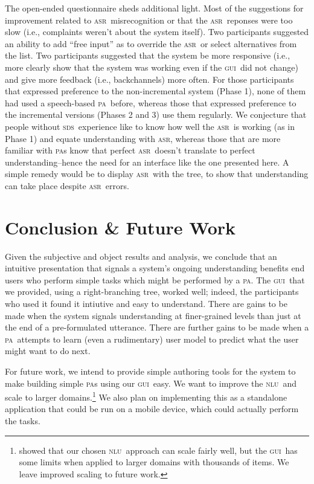 \documentclass[11pt]{article}
\newcommand{\sds}[0]{\textsc{sds}}
\newcommand{\nlu}[0]{\textsc{nlu}}
\newcommand{\asr}[0]{\textsc{asr}}
\newcommand{\ui}[0]{\textsc{gui}}
\newcommand{\pa}[0]{\textsc{pa}}
\begin{document}
The open-ended questionnaire sheds additional light. Most of the suggestions for improvement related to \asr\ misrecognition or that the \asr\ reponses were too slow (i.e., complaints weren't about the system itself). Two participants suggested an ability to add ``free input'' as to override the \asr\ or select alternatives from the list. Two participants suggested that the system be more responsive (i.e., more clearly show that the system was working even if the \ui\ did not change) and give more feedback (i.e., backchannels) more often. For those participants that expressed preference to the non-incremental system (Phase 1), none of them had used a speech-based \pa\ before, whereas those that expressed preference to the incremental versions (Phases 2 and 3) use them regularly. We conjecture that people without \sds\ experience like to know how well the \asr\ is working (as in Phase 1) and equate understanding with \asr, whereas those that are more familiar with \pa s know that perfect \asr\ doesn't translate to perfect understanding--hence the need for an interface like the one presented here. A simple remedy would be to display \asr\ with the tree, to show that understanding can take place despite \asr\ errors.

\section{Conclusion \& Future Work}

Given the subjective and object results and analysis, we conclude that an intuitive presentation that signals a system's ongoing understanding benefits end users who perform simple tasks which might be performed by a \pa. The \ui\ that we provided, using a right-branching tree, worked well; indeed, the participants who used it found it intiutive and easy to understand. There are gains to be made when the system signals understanding at finer-grained levels than just at the end of a pre-formulated utterance. There are further gains to be made when a \pa\ attempts to learn (even a rudimentary) user model to predict what the user might want to do next. 

For future work, we intend to provide simple authoring tools for the system to make building simple \pa s using our \ui\ easy. We want to improve the \nlu\ and scale to larger domains.\footnote{ showed that our chosen \nlu\ approach can scale fairly well, but the \ui\ has some limits when applied to larger domains with thousands of items. We leave improved scaling to future work.} We also plan on implementing this as a standalone application that could be run on a mobile device, which could actually perform the tasks.
\end{document}
